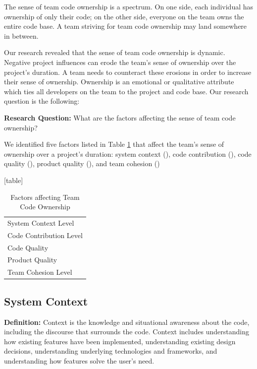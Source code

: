 The sense of team code ownership is a spectrum. On one side, each individual has ownership of only their code;  on the other side, everyone on the team owns the entire code base. A team striving for team code ownership may land somewhere in between. 

Our research revealed that the sense of team code ownership is dynamic. Negative project influences can erode the team's sense of ownership over the project's duration. A team needs to counteract these erosions in order to increase their sense of ownership. Ownership is an emotional or qualitative attribute which ties all developers on the team to the project and code base. Our research question is the following:

\textbf{Research Question:} What are the factors affecting the sense of team code ownership?

We identified five factors listed in Table \ref{TeamCodeOwnerhipFactors} that affect the team's sense of ownership over a project's duration: system context (), code contribution (), code quality (), product quality (), and team cohesion ()

[table]

\begin{table}[]
\renewcommand{\arraystretch}{1.5}
\centering
\caption{Factors affecting Team Code Ownership}
\label{TeamCodeOwnerhipFactors}
\begin{tabular}{|p{3.1in}|}
\hline
System Context Level \\
Code Contribution Level \\
Code Quality \\
Product Quality \\
Team Cohesion Level \\
\hline
\end{tabular}
\end{table}
\subsection{System Context}
\textbf{Definition:} Context is the knowledge and situational awareness about the code, including the discourse that surrounds the code. Context includes understanding how existing features have been implemented, understanding existing design decisions, understanding underlying technologies and frameworks, and understanding how features solve the user's need.

